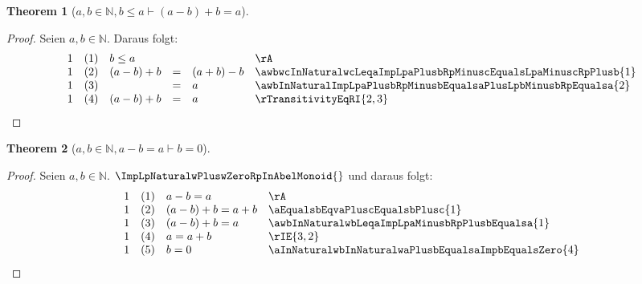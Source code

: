 \documentclass{book}
\theoremstyle{plain}
\newtheorem{theorem}{Theorem}
\theoremstyle{remark}
\theoremstyle{definition}
\begin{document}
\label{awbInNaturalwbLeqaImpLpaMinusbRpPlusbEqualsa}
\begin{theorem}[\(a,b\in\mathbb{N},b\leq a \vdash (a-b)+b=a\)]
\end{theorem}
\begin{proof}
    Seien \(a,b\in\mathbb{N}\). Daraus folgt:
        \[
	\begin{array}{llclll}
             1 &  (1) & \multicolumn{3}{l}{b\leq a} & \rA \\
             1 &  (2) & (a-b)+b&=&(a+b)-b & \awbwcInNaturalwcLeqaImpLpaPlusbRpMinuscEqualsLpaMinuscRpPlusb{1} \\
             1 &  (3) & &=&a & \awbInNaturalImpLpaPlusbRpMinusbEqualsaPlusLpbMinusbRpEqualsa{2} \\
             1 &  (4) & (a-b)+b&=&a & \rTransitivityEqRI{2,3} \\
    \end{array}
	\]
\end{proof}

\label{awbInNaturalwaMinusbEqualsaImpbEqualsZero}
\begin{theorem}[\(a,b\in\mathbb{N}, a-b=a\vdash b=0\)]
\end{theorem}
\begin{proof}
    Seien \(a,b\in\mathbb{N}\). \(\ImpLpNaturalwPluswZeroRpInAbelMonoid{}\) und daraus folgt:
        \[
	\begin{array}{llclll}
             1 &  (1) & \multicolumn{3}{l}{a-b=a} & \rA \\
             1 &  (2) & \multicolumn{3}{l}{(a-b)+b=a+b} & \aEqualsbEqvaPluscEqualsbPlusc{1} \\
             1 &  (3) & \multicolumn{3}{l}{(a-b)+b=a} & \awbInNaturalwbLeqaImpLpaMinusbRpPlusbEqualsa{1} \\
             1 &  (4) & \multicolumn{3}{l}{a=a+b} & \rIE{3,2} \\
             1 &  (5) & \multicolumn{3}{l}{b=0} & \aInNaturalwbInNaturalwaPlusbEqualsaImpbEqualsZero{4} \\
    \end{array}
	\]
\end{proof}
\end{document}

